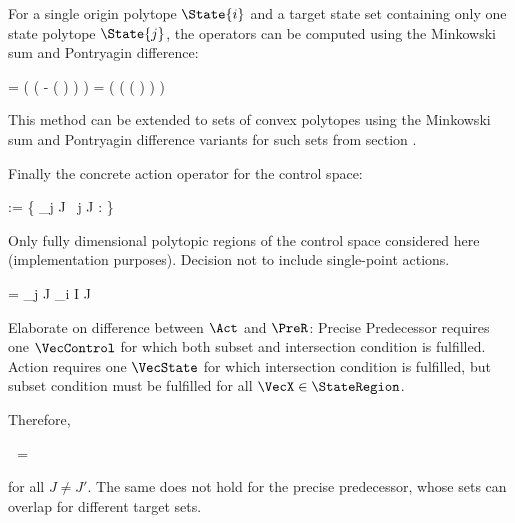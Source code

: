     For a single origin polytope $\State{i}$ and a target state set containing only one state polytope $\State{j}$, the operators can be computed using the Minkowski sum and Pontryagin difference:

    \startformula
        \startalign[n=2,align={right,left}]
            \NC {} =
            \NC \Big( (  \oplus - (\MatA {} \oplus \RandomSpace) ) \MatB \Big) \cap \ControlSpace \EndComma
            \NR
            \NC {} =
            \NC \Big( (  \ominus (\MatA {} \oplus \RandomSpace) ) \MatB \Big) \cap \ControlSpace \EndPeriod
            \NR
        \stopalign
    \stopformula

    This method can be extended to sets of convex polytopes using the Minkowski sum and Pontryagin difference variants for such sets from section .

    Finally the concrete action operator for the control space:

    \startformula
        \startalign[n=2,align={right,left}]
            \NC {} := \Big\{ \VecControl \in \ControlSpace \Bigmid
            \NC \Posterior{\StateRegion}{\VecControl} \subseteq \bigcup_{j \in J}  \;
            \NR
            \NC \empty
            \NC ~\forall j \in J : \Posterior{\StateRegion}{\VecControl} \cap {} \neq \emptyset \Big\} \EndPeriod
            \NR
        \stopalign
    \stopformula

    Only fully dimensional polytopic regions of the control space considered here (implementation purposes).
    Decision not to include single-point actions.

    \startformula
        \startalign[n=2,align={right,left}]
            \NC {} =
            \NC \bigcap_{j \in J}  \setminus \bigcup_{i \in I \setminus J} \EndPeriod
            \NR
        \stopalign
    \stopformula

    Elaborate on difference between $\Act$ and $\PreR$: Precise Predecessor requires one $\VecControl$ for which both subset and intersection condition is fulfilled.
    Action requires one $\VecState$ for which intersection condition is fulfilled, but subset condition must be fulfilled for all $\VecX \in \StateRegion$.

    Therefore,

    \startformula
         \,\cap\,  = \emptyset
    \stopformula

    for all $J \neq J'$.
    The same does not hold for the precise predecessor, whose sets can overlap for different target sets.

\stopsection

